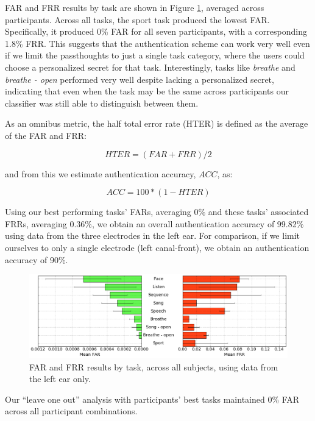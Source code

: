 \documentclass[a4paper,twoside]{article}
\begin{document}
FAR and FRR results by task are shown in Figure \ref{fig:meanByTask}, averaged across participants. Across all tasks, the sport task produced the lowest FAR. Specifically, it produced 0\% FAR for all seven participants, with a corresponding 1.8\% FRR. This suggests that the authentication scheme can work very well even if we limit the passthoughts to just a single task category, where the users could choose a personalized secret for that task. Interestingly, tasks like \textit{breathe} and \textit{breathe - open} performed very well despite lacking a personalized secret, indicating that even when the task may be the same across participants our classifier was still able to distinguish between them.

As an omnibus metric, the half total error rate (HTER) is defined as the average of the FAR and FRR: 

\begin{equation}\label{eq1}
     HTER = (FAR + FRR) / 2
\end{equation}

and from this we estimate authentication accuracy, $ACC$, as:

\begin{equation}\label{eq2}
     ACC = 100 * (1 - HTER)
\end{equation}

Using our best performing tasks' FARs, averaging 0\% and these tasks' associated FRRs, averaging 0.36\%, we obtain an overall authentication accuracy of 99.82\% using data from the three electrodes in the left ear. For comparison, if we limit ourselves to only a single electrode (left canal-front), we obtain an authentication accuracy of 90\%.

\begin{figure}
\centering
\includegraphics[width=.9\linewidth]{./figures/mean-far-and-frr-by-task.png}
\caption{FAR and FRR results by task, across all subjects, using data from the left ear only.}
\label{fig:meanByTask}
\end{figure}

Our ``leave one out'' analysis with participants' best tasks maintained 0\% FAR across all participant combinations. 
\end{document}
